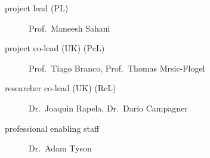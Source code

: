 
\begin{description}
    \item[project lead (PL)] Prof.~Maneesh Sahani
    \item[project co-lead (UK) (PcL)] Prof.~Tiago Branco, Prof.~Thomas Mrsic-Flogel
    \item[researcher co-lead (UK) (RcL)] Dr.~Joaquin Rapela, Dr.~Dario Campagner
    \item[professional enabling staff] Dr.~Adam Tyson
\end{description}
